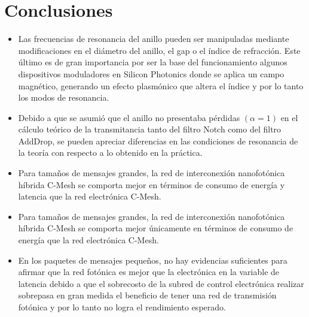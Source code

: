 \documentclass{IEEEtran}
\begin{document}
\section{Conclusiones}
\begin{itemize}
\item Las frecuencias de resonancia del anillo pueden ser manipuladas mediante
modificaciones en el diámetro del anillo, el gap o el índice de refracción. Este
último es de gran importancia por ser la base del funcionamiento algunos dispositivos
moduladores en Silicon Photonics donde se aplica un campo
magnético, generando un efecto plasmónico que altera el índice y por lo tanto
los modos de resonancia.
\item Debido a que se asumió que el anillo no presentaba pérdidas $(\alpha = 1)$ en
el cálculo teórico de la transmitancia tanto del filtro Notch como del filtro
AddDrop, se pueden apreciar diferencias en las condiciones de resonancia
de la teoría con respecto a lo obtenido en la práctica.
\item Para tamaños de mensajes grandes, la red de interconexión nanofotónica
híbrida C-Mesh se comporta mejor en términos de consumo de energía y latencia
que la red electrónica C-Mesh.
\item  Para tamaños de mensajes grandes, la red de interconexión nanofotónica
híbrida C-Mesh se comporta mejor únicamente en términos de consumo de energía 
que la red electrónica C-Mesh.
\item  En los paquetes de mensajes pequeños,
no hay evidencias suficientes para afirmar que la red fotónica
es mejor que la electrónica en la variable de latencia debido a que
el sobrecosto de la subred de control electrónica realizar 
sobrepasa en gran medida el beneficio de tener una red de transmisión fotónica 
y por lo tanto no logra el rendimiento esperado.
\end{itemize} 
\end{document}
